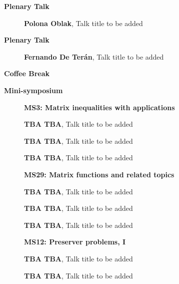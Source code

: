 \documentclass[ILAS2025-program.tex]{subfiles}
\begin{document}
    \begin{description}
    \item[] \textbf{Plenary Talk} 
    \begin{description}
        \item[] \textbf{Polona Oblak}, Talk title to be added
        \end{description}
        \item[] \textbf{Plenary Talk} 
    \begin{description}
        \item[] \textbf{Fernando De Terán}, Talk title to be added
        \end{description}
        \item[] \textbf{Coffee Break} 
    \item[] \textbf{Mini-symposium} 
    \begin{description}
    \item[] \textbf{MS3: Matrix inequalities with applications} 
    \item[] \textbf{TBA TBA}, Talk title to be added
        \item[] \textbf{TBA TBA}, Talk title to be added
        \item[] \textbf{TBA TBA}, Talk title to be added
        \end{description}
    \begin{description}
    \item[] \textbf{MS29: Matrix functions and related topics} 
    \item[] \textbf{TBA TBA}, Talk title to be added
        \item[] \textbf{TBA TBA}, Talk title to be added
        \item[] \textbf{TBA TBA}, Talk title to be added
        \end{description}
    \begin{description}
    \item[] \textbf{MS12: Preserver problems, I} 
    \item[] \textbf{TBA TBA}, Talk title to be added
        \item[] \textbf{TBA TBA}, Talk title to be added

\end{description}
\end{description}
\end{document}
